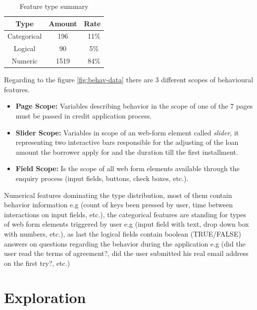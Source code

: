 \begin{table}[h!]
  \begin{center}
    \caption{Feature type summary}
    \label{tab:feature-summary}
    \begin{tabular}{c|c|c}
    Type & Amount & Rate \\
      \hline
     Categorical & 196 & ~11\% \\ 
     \hline
     Logical & 90 &  ~5\% \\
     \hline
     Numeric & 1519 &  ~84\% \\
     \hline
    \end{tabular}
  \end{center}
\end{table}

Regarding to the figure \ref{fig:behav-data} there are 3 different scopes of behavioural features.

\begin{itemize}
    \item \textbf{Page Scope:} Variables describing behavior in the scope of one of the 7 pages must be passed in credit application process. 
    \item \textbf{Slider Scope: } Variables in scope of an web-form element called \textit{slider}, it representing two interactive bars responsible for the adjusting of the loan amount the borrower apply for and the duration till the first installment.
    \item \textbf{Field Scope:} Is the scope of all web form elements available through the enquiry process (input fields, buttons, check boxes, etc.).
\end{itemize}


Numerical features dominating the type distribution, most of them contain behavior information e.g (count of keys been pressed by user, time between interactions on input fields, etc.), the categorical features are standing for types of web form elements triggered by user e.g (input field with text, drop down box with numbers, etc.), as last the logical fields contain boolean (TRUE/FALSE) answers on questions regarding the behavior during the application e.g (did the user read the terms of agreement?, did the user submitted his real email address on the first try?, etc.)

\section{Exploration}\label{Ch:2:Exploration}

